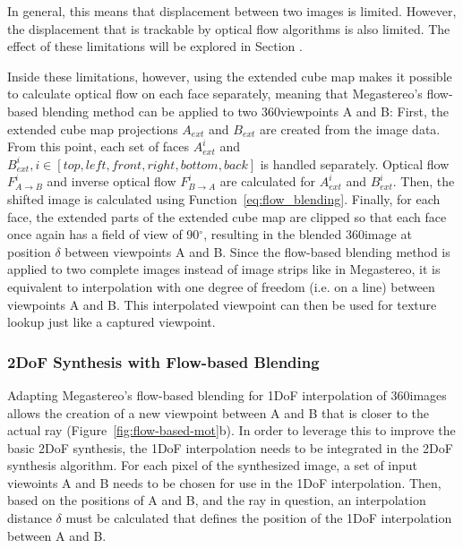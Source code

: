 In general, this means that displacement between two images is limited. However, the displacement that is trackable by optical flow algorithms is also limited. The effect of these limitations will be explored in Section .

Inside these limitations, however, using the extended cube map makes it possible to calculate optical flow on each face separately, meaning that Megastereo's flow-based blending method can be applied to two 360\degree viewpoints A and B: First, the extended cube map projections $A_{ext}$ and $B_{ext}$ are created from the image data. From this point, each set of faces $A_{ext}^{i}$ and $B_{ext}^{i}, i \in [top, left, front, right, bottom, back]$ is handled separately. Optical flow $F_{A\to B}^i$ and inverse optical flow $F_{B\to A}^i$ are calculated for $A_{ext}^{i}$ and $B_{ext}^{i}$. Then, the shifted image is calculated using Function~\ref{eq:flow_blending}. Finally, for each face, the extended parts of the extended cube map are clipped so that each face once again has a field of view of 90$^{\circ}$, resulting in the blended 360\degree image at position $\delta$ between viewpoints A and B. Since the flow-based blending method is applied to two complete images instead of image strips like in Megastereo, it is equivalent to interpolation with one degree of freedom (i.e. on a line) between viewpoints A and B. This interpolated viewpoint can then be used for texture lookup just like a captured viewpoint.

\subsubsection{2DoF Synthesis with Flow-based Blending} \label{subsec:2dof_flow-based}
Adapting Megastereo's flow-based blending for 1DoF interpolation of 360\degree images allows the creation of a new viewpoint between A and B that is closer to the actual ray (Figure~\ref{fig:flow-based-mot}b). In order to leverage this to improve the basic 2DoF synthesis, the 1DoF interpolation needs to be integrated in the 2DoF synthesis algorithm. For each pixel of the synthesized image, a set of input viewoints A and B needs to be chosen for use in the 1DoF interpolation. Then, based on the positions of A and B, and the ray in question, an interpolation distance $\delta$ must be calculated that defines the position of the 1DoF interpolation between A and B.


